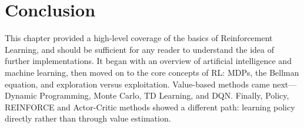 \section{Conclusion}


This chapter provided a high-level coverage of the basics of Reinforcement Learning, and should be sufficient for any reader to understand the idea of further implementations. It began with an overview of artificial intelligence and machine learning, then moved on to the core concepts of RL: MDPs, the Bellman equation, and exploration versus exploitation. Value-based methods came next—Dynamic Programming, Monte Carlo, TD Learning, and DQN. Finally, Policy, REINFORCE and Actor-Critic methods showed a different path: learning policy directly rather than through value estimation.
















